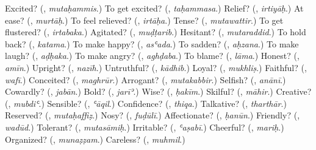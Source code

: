 \begin{tcolorbox}[breakable,colback=teal!4,colframe=teal!35!black,title={Before you move on}]
Excited? (\textbf{}, \emph{mutaḥammis}.) To get excited? (\textbf{}, \emph{taḥammasa}.) Relief? (\textbf{}, \emph{irtiyāḥ}.) At ease? (\textbf{}, \emph{murtāḥ}.) To feel relieved? (\textbf{}, \emph{irtāḥa}.) Tense? (\textbf{}, \emph{mutawattir}.) To get flustered? (\textbf{}, \emph{irtabaka}.) Agitated? (\textbf{}, \emph{muḍṭarib}.) Hesitant? (\textbf{}, \emph{mutaraddid}.) To hold back? (\textbf{}, \emph{katama}.) To make happy? (\textbf{}, \emph{asʿada}.) To sadden? (\textbf{}, \emph{aḥzana}.) To make laugh? (\textbf{}, \emph{aḍḥaka}.) To make angry? (\textbf{}, \emph{aghḍaba}.) To blame? (\textbf{}, \emph{lāma}.) Honest? (\textbf{}, \emph{amīn}.) Upright? (\textbf{}, \emph{nazīh}.) Untruthful? (\textbf{}, \emph{kādhib}.) Loyal? (\textbf{}, \emph{mukhliṣ}.) Faithful? (\textbf{}, \emph{wafī}.) Conceited? (\textbf{}, \emph{maghrūr}.) Arrogant? (\textbf{}, \emph{mutakabbir}.) Selfish? (\textbf{}, \emph{anānī}.) Cowardly? (\textbf{}, \emph{jabān}.) Bold? (\textbf{}, \emph{jarīʾ}.) Wise? (\textbf{}, \emph{ḥakīm}.) Skilful? (\textbf{}, \emph{māhir}.) Creative? (\textbf{}, \emph{mubdiʿ}.) Sensible? (\textbf{}, \emph{ʿāqil}.) Confidence? (\textbf{}, \emph{thiqa}.) Talkative? (\textbf{}, \emph{tharthār}.) Reserved? (\textbf{}, \emph{mutaḥaffiẓ}.) Nosy? (\textbf{}, \emph{fuḍūlī}.) Affectionate? (\textbf{}, \emph{ḥanūn}.) Friendly? (\textbf{}, \emph{wadūd}.) Tolerant? (\textbf{}, \emph{mutasāmiḥ}.) Irritable? (\textbf{}, \emph{ʿaṣabī}.) Cheerful? (\textbf{}, \emph{mariḥ}.) Organized? (\textbf{}, \emph{munaẓẓam}.) Careless? (\textbf{}, \emph{muhmil}.)
\end{tcolorbox}
